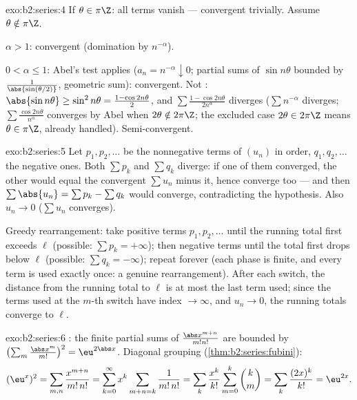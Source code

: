 \begin{solution}{exo:b2:series:4}
If $\theta \in \pi\Z$: all terms vanish --- convergent trivially.
Assume $\theta \notin \pi\Z$.

$\alpha > 1$:  convergent (domination by $n^{-\alpha}$).

$0 < \alpha \leq 1$: Abel's test applies ($a_n = n^{-\alpha}
\downarrow 0$; partial sums of $\sin n\theta$ bounded by
$\frac{1}{\abs{\sin(\theta/2)}}$, geometric sum): convergent. Not
: $\abs{\sin n\theta} \geq \sin^2 n\theta = \frac{1 -
\cos 2n\theta}{2}$, and $\sum \frac{1 - \cos 2n\theta}{2n^\alpha}$
diverges ($\sum n^{-\alpha}$ diverges; $\sum
\frac{\cos 2n\theta}{n^\alpha}$ converges by Abel when $2\theta
\notin 2\pi\Z$; the excluded case $2\theta \in 2\pi\Z$ means
$\theta \in \pi\Z$, already handled). Semi-convergent.
\end{solution}

\begin{solution}{exo:b2:series:5}
Let $p_1, p_2, \dots$ be the nonnegative terms of $(u_n)$ in order,
$q_1, q_2, \dots$ the negative ones. Both $\sum p_k$ and $\sum
q_k$ diverge: if one of them converged, the other would equal the
convergent $\sum u_n$ minus it, hence converge too --- and then
$\sum \abs{u_n} = \sum p_k - \sum q_k$ would converge, contradicting
the hypothesis. Also $u_n \to 0$ ($\sum u_n$ converges).

Greedy rearrangement: take positive terms $p_1, p_2, \dots$ until
the running total first exceeds $\ell$ (possible: $\sum p_k =
+\infty$); then negative terms until the total first drops below
$\ell$ (possible: $\sum q_k = -\infty$); repeat forever (each
phase is finite, and every term is used exactly once: a genuine
rearrangement). After each switch, the distance from the running
total to $\ell$ is at most the last term used; since the terms used
at the $m$-th switch have index $\to \infty$, and $u_n \to 0$,
the running totals converge to $\ell$.
\end{solution}

\begin{solution}{exo:b2:series:6}
: the finite partial sums of
$\frac{\abs x^{m+n}}{m!n!}$ are bounded by $\bigl(\sum_m
\frac{\abs x^m}{m!}\bigr)^2 = \eu^{2\abs x}$. Diagonal grouping
(\cref{thm:b2:series:fubini}):
\[
(\eu^{x})^2 = \sum_{m,n} \frac{x^{m+n}}{m!\,n!}
= \sum_{k=0}^{\infty} x^k \sum_{m+n=k} \frac{1}{m!\,n!}
= \sum_k \frac{x^k}{k!}\sum_{m=0}^{k}\binom km
= \sum_k \frac{(2x)^k}{k!} = \eu^{2x} .
\]
\end{solution}

